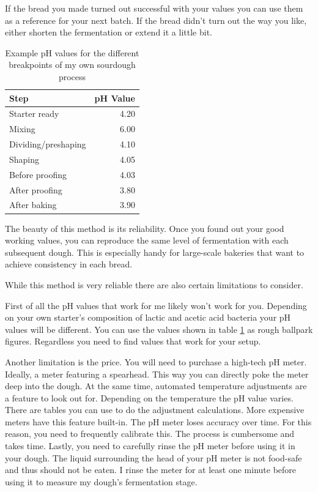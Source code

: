 If the bread you made turned out successful with your values
you can use them as a reference for your next batch. If the
bread didn't turn out the way you like, either shorten
the fermentation or extend it a little bit.

\begin{table}[!htb]
  \begin{tabular}{|l|r|}
  \hline
  \textbf{Step}       & \multicolumn{1}{l|}{\textbf{pH Value}} \\ \hline
  Starter ready       & 4.20                                   \\ \hline
  Mixing              & 6.00                                   \\ \hline
  Dividing/preshaping & 4.10                                   \\ \hline
  Shaping             & 4.05                                   \\ \hline
  Before proofing     & 4.03                                   \\ \hline
  After proofing      & 3.80                                   \\ \hline
  After baking        & 3.90                                   \\ \hline
  \end{tabular}
  \caption{Example pH values for the different breakpoints of my own sourdough process}
  \label{table:sample-ph-values}
\end{table}

The beauty of this method is its reliability. Once you found
out your good working values, you can reproduce
the same level of fermentation with each subsequent dough.
This is especially handy for large-scale bakeries that want
to achieve consistency in each bread.

While this method is very reliable there are also certain
limitations to consider.

First of all the pH values that work for me likely won't work for
you. Depending on your own starter's composition of lactic 
and acetic acid bacteria your pH values will be different.
You can use the values shown in table \ref{table:sample-ph-values}
as rough ballpark figures. Regardless you need to find values
that work for your setup.

Another limitation is the price. You will need to purchase
a high-tech pH meter. Ideally, a meter featuring a spearhead.
This way you can directly poke the meter deep into the dough.
At the same time, automated temperature adjustments are a
feature to look out for. Depending on the temperature
the pH value varies. There are tables you can use to
do the adjustment calculations. More expensive meters
have this feature built-in. The pH meter loses accuracy
over time. For this reason, you need to frequently
calibrate this. The process is cumbersome and takes time.
Lastly, you need to carefully rinse the pH meter before
using it in your dough. The liquid surrounding the
head of your pH meter is not food-safe and thus should
not be eaten. I rinse the meter for at least one minute
before using it to measure my dough's fermentation stage.

